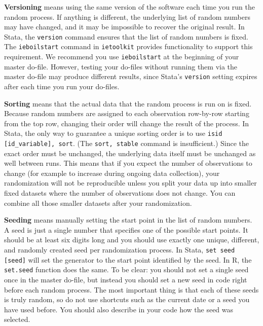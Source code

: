 \textbf{Versioning} means using the same version of the software each time you run the random process.
If anything is different, the underlying list of random numbers may have changed,
and it may be impossible to recover the original result.
In Stata, the \texttt{version} command ensures that the list of random numbers is fixed.
The \texttt{ieboilstart} command in \texttt{ietoolkit} provides functionality to support this requirement.
We recommend you use \texttt{ieboilstart} at the beginning of your master do-file.
However, testing your do-files without running them
via the master do-file may produce different results,
since Stata's \texttt{version} setting expires after each time you run your do-files.

\textbf{Sorting} means that the actual data that the random process is run on is fixed.
Because random numbers are assigned to each observation row-by-row starting from
the top row,
changing their order will change the result of the process.
In Stata, the only way to guarantee a unique sorting order is to use
\texttt{isid [id\_variable], sort}.
(The \texttt{sort, stable} command is insufficient.)
Since the exact order must be unchanged,
the underlying data itself must be unchanged as well between runs.
This means that if you expect the number of observations to change
(for example to increase during ongoing data collection),
your randomization will not be reproducible unless you split your data up into
smaller fixed datasets where the number of observations does not change.
You can combine all
those smaller datasets after your randomization.


\textbf{Seeding} means manually setting the start point in the list of random numbers.
A seed is just a single number that specifies one of the possible start points.
It should be at least six digits long and you should use exactly
one unique, different, and randomly created seed per randomization process.
In Stata, \texttt{set seed [seed]} will set the generator
to the start point identified by the seed.
In R, the \texttt{set.seed} function does the same.
To be clear: you should not set a single seed once in the master do-file,
but instead you should set a new seed in code right before each random process.
The most important thing is that each of these seeds is truly random,
so do not use shortcuts such as the current date or a seed you have used before.
You should also describe in your code how the seed was selected.

